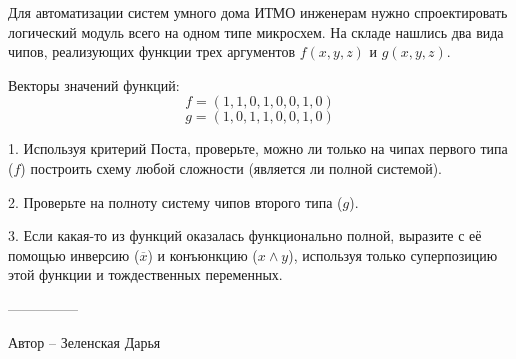 \question
Для автоматизации систем умного дома ИТМО инженерам нужно спроектировать логический модуль всего на одном типе микросхем. На складе нашлись два вида чипов, реализующих функции трех аргументов $f(x,y,z)$ и $g(x,y,z)$.

Векторы значений функций:
\[ f = (1,1,0,1,0,0,1,0) \]
\[ g = (1,0,1,1,0,0,1,0) \]

1. Используя критерий Поста, проверьте, можно ли только на чипах первого типа ($f$) построить схему любой сложности (является ли полной системой).

2. Проверьте на полноту систему чипов второго типа ($g$).

3. Если какая-то из функций оказалась функционально полной, выразите с её помощью инверсию ($\overline{x}$) и конъюнкцию ($x \land y$), используя только суперпозицию этой функции и тождественных переменных.

---------------

Автор -- Зеленская Дарья